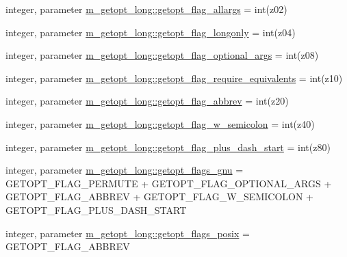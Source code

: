 \begin{DoxyCompactItemize}
\item 
integer, parameter \hyperlink{namespacem__getopt__long_a8e9b76527b39fe8c8311edfb3ca252f3}{m\+\_\+getopt\+\_\+long\+::getopt\+\_\+flag\+\_\+allargs} = int(z\textquotesingle{}02\textquotesingle{})
\item 
integer, parameter \hyperlink{namespacem__getopt__long_a78dad148f97ee14b2dc1c1e3f66775a8}{m\+\_\+getopt\+\_\+long\+::getopt\+\_\+flag\+\_\+longonly} = int(z\textquotesingle{}04\textquotesingle{})
\item 
integer, parameter \hyperlink{namespacem__getopt__long_a5d97a0339a2798c3275ef32d5bac5407}{m\+\_\+getopt\+\_\+long\+::getopt\+\_\+flag\+\_\+optional\+\_\+args} = int(z\textquotesingle{}08\textquotesingle{})
\item 
integer, parameter \hyperlink{namespacem__getopt__long_a8ed12f1d43098e7e6cbe7f4a6b9a9352}{m\+\_\+getopt\+\_\+long\+::getopt\+\_\+flag\+\_\+require\+\_\+equivalents} = int(z\textquotesingle{}10\textquotesingle{})
\item 
integer, parameter \hyperlink{namespacem__getopt__long_a519f914b784104158b07034c85767007}{m\+\_\+getopt\+\_\+long\+::getopt\+\_\+flag\+\_\+abbrev} = int(z\textquotesingle{}20\textquotesingle{})
\item 
integer, parameter \hyperlink{namespacem__getopt__long_ae60135d11126a953a2bac414e62f57ac}{m\+\_\+getopt\+\_\+long\+::getopt\+\_\+flag\+\_\+w\+\_\+semicolon} = int(z\textquotesingle{}40\textquotesingle{})
\item 
integer, parameter \hyperlink{namespacem__getopt__long_a928e9e8b9d3688cd9c0fc38b33568da9}{m\+\_\+getopt\+\_\+long\+::getopt\+\_\+flag\+\_\+plus\+\_\+dash\+\_\+start} = int(z\textquotesingle{}80\textquotesingle{})
\item 
integer, parameter \hyperlink{namespacem__getopt__long_a5c591e4e0cabebe3bdb56263f6ad7a10}{m\+\_\+getopt\+\_\+long\+::getopt\+\_\+flags\+\_\+gnu} = G\+E\+T\+O\+P\+T\+\_\+\+F\+L\+A\+G\+\_\+\+P\+E\+R\+M\+U\+TE + G\+E\+T\+O\+P\+T\+\_\+\+F\+L\+A\+G\+\_\+\+O\+P\+T\+I\+O\+N\+A\+L\+\_\+\+A\+R\+GS + G\+E\+T\+O\+P\+T\+\_\+\+F\+L\+A\+G\+\_\+\+A\+B\+B\+R\+EV + G\+E\+T\+O\+P\+T\+\_\+\+F\+L\+A\+G\+\_\+\+W\+\_\+\+S\+E\+M\+I\+C\+O\+L\+ON + G\+E\+T\+O\+P\+T\+\_\+\+F\+L\+A\+G\+\_\+\+P\+L\+U\+S\+\_\+\+D\+A\+S\+H\+\_\+\+S\+T\+A\+RT
\item 
integer, parameter \hyperlink{namespacem__getopt__long_ab052891b2a58dcaa186b04aaf6d6e0a0}{m\+\_\+getopt\+\_\+long\+::getopt\+\_\+flags\+\_\+posix} = G\+E\+T\+O\+P\+T\+\_\+\+F\+L\+A\+G\+\_\+\+A\+B\+B\+R\+EV
\item 

\end{DoxyCompactItemize}
